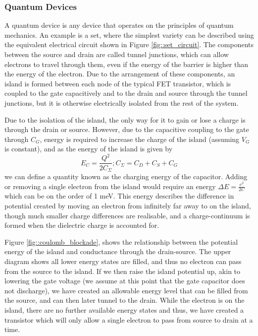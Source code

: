 \subsubsection{Quantum Devices}
\label{sec::set}
A quantum device is any device that operates on the principles of quantum mechanics. An example is a \gls{set}, where the simplest variety can be described using the equivalent electrical circuit \cite{devoret2000amplifying} shown in Figure \ref{fig::set_circuit}. The components between the source and drain are called tunnel junctions, which can allow electrons to travel through them, even if the energy of the barrier is higher than the energy of the electron. Due to the arrangement of these components, an island is formed between each node of the typical FET transistor, which is coupled to the gate capacitively and to the drain and source through the tunnel junctions, but it is otherwise electrically isolated from the rest of the system.

Due to the isolation of the island, the only way for it to gain or lose a charge is through the drain or source. However, due to the capacitive coupling to the gate through $C_G$, energy is required to increase the charge of the island (assuming $V_G$ is constant), and as the energy of the island is given by $$E_C = \frac{Q^2}{2 C_\Sigma} ; C_\Sigma = C_D + C_S + C_G$$ we can define a quantity known as the charging energy of the capacitor. Adding or removing a single electron from the island would require an energy $\Delta E = \frac{e^2}{2 C}$ which can be on the order of 1 meV. This energy describes the difference in potential created by moving an electron from infinitely far away to on the island, though much smaller charge differences are realisable, and a charge-continuum is formed when the dielectric charge is accounted for.

Figure \ref{fig::coulomb_blockade}, shows the relationship between the potential energy of the island and conductance through the drain-source. The upper diagram shows all lower energy states are filled, and thus no electron can pass from the source to the island. If we then raise the island potential up, akin to lowering the gate voltage (we assume at this point that the gate capacitor does not discharge), we have created an allowable energy level that can be filled from the source, and can then later tunnel to the drain. While the electron is on the island, there are no further available energy states and thus, we have created a transistor which will only allow a single electron to pass from source to drain at a time.

